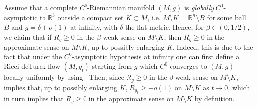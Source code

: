 \documentclass[a4paper,12pt,reqno]{amsart}
\numberwithin{equation}{section}
\theoremstyle{plain}
\theoremstyle{definition}
\theoremstyle{remark}
\newcommand{\R}{\mathbb{R}}
\begin{document}
  Assume that a complete $C^0$-Riemannian manifold $(M,g)$ is \textit{globally} $C^0$-asymptotic to $\mathbb R^3$ outside a compact set $K\subset M$, i.e. $M \setminus K = \R^n \setminus B$ for some ball $B$ and $g = \delta + o(1)$ at infinity, with $\delta$ the flat metric. Hence, for $\beta\in (0,1/2)$, we claim that if $R_{g}\geq 0$ in the $\beta$-weak sense \cite[Definition 2.3]{PaulaADM} on $M\setminus K$, then $R_g\geq 0$ in the approximate sense on $M\setminus K$, up to possibly enlarging $K$. Indeed, this is due to the fact that under the $C^0$-asymptotic hypothesis at infinity one can first define a Ricci-deTurck flow $(M,g_t)$ starting from $g$ which $C^0$-converges to $(M,g)$ locally uniformly by using \cite[Theorem 1.1]{SimonC0}. Then, since $R_{g}\geq 0$ in the $\beta$-weak sense on $M\setminus K$, \cite[Lemma 5.1]{PaulaADM} implies that, up to possibly enlarging $K$, $R_{g_t}\geq -o(1)$ on $M\setminus K$ as $t\to 0$, which in turn implies that $R_{g}\geq 0$ in the approximate sense on $M\setminus K$ by definition.
\end{document}
